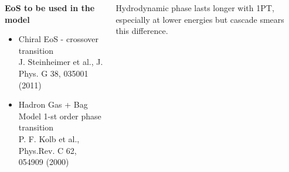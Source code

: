 \documentclass[dvipsnames] {beamer}
\begin{document}
\begin{frame}
\begin{columns}[t]
          \begin{block}{\bf \centering \scriptsize EoS to be used in the model}
            \begin{itemize}
            \item \tiny Chiral EoS - crossover transition \\ J. Steinheimer et al., J. Phys. G 38, 035001 (2011)
            \item \tiny Hadron Gas + Bag Model 1-st order phase transition \\ P. F. Kolb et al., Phys.Rev. C 62, 054909 (2000)
            \end{itemize}
          \end{block}
          \vskip -0.4cm
          \begin{block}{}
            {\scriptsize {\color{darkblue!70!black} Hydrodynamic phase lasts longer with 1PT,
                especially at lower energies but cascade smears this difference.}}
          \end{block}


\end{columns}
\end{frame}
\end{document}
